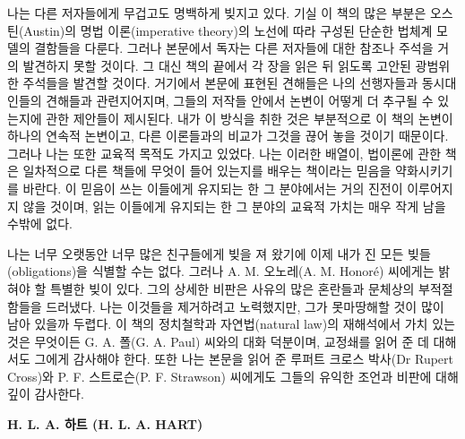 {나는 다른 저자들에게 무겁고도 명백하게 빚지고 있다. 기실 이 책의 많은
부분은 오스틴(Austin)의 명법 이론(imperative theory)의 노선에 따라
구성된 단순한 법체계 모델의 결함들을 다룬다. 그러나 본문에서 독자는 다른
저자들에 대한 참조나 주석을 거의 발견하지 못할 것이다. 그 대신 책의
끝에서 각 장을 읽은 뒤 읽도록 고안된 광범위한 주석들을 발견할 것이다.
거기에서 본문에 표현된 견해들은 나의 선행자들과 동시대인들의 견해들과
관련지어지며, 그들의 저작들 안에서 논변이 어떻게 더 추구될 수 있는지에
관한 제안들이 제시된다. 내가 이 방식을 취한 것은 부분적으로 이 책의
논변이 하나의 연속적 논변이고, 다른 이론들과의 비교가 그것을 끊어 놓을
것이기 때문이다. 그러나 나는 또한 교육적 목적도 가지고 있었다. 나는
이러한 배열이, 법이론에 관한 책은 일차적으로 다른 책들에 무엇이 들어
있는지를 배우는 책이라는 믿음을 약화시키기를 바란다. 이 믿음이 쓰는
이들에게 유지되는 한 그 분야에서는 거의 진전이 이루어지지 않을 것이며,
읽는 이들에게 유지되는 한 그 분야의 교육적 가치는 매우 작게 남을 수밖에
없다.

나는 너무 오랫동안 너무 많은 친구들에게 빚을 져 왔기에 이제 내가 진 모든
빚들(obligations)을 식별할 수는 없다. 그러나 A. M. 오노레(A. M. Honoré)
씨에게는 밝혀야 할 특별한 빚이 있다. 그의 상세한 비판은 사유의 많은
혼란들과 문체상의 부적절함들을 드러냈다. 나는 이것들을 제거하려고
노력했지만, 그가 못마땅해할 것이 많이 남아 있을까 두렵다. 이 책의
정치철학과 자연법(natural law)의 재해석에서 가치 있는 것은 무엇이든 G.
A. 폴(G. A. Paul) 씨와의 대화 덕분이며, 교정쇄를 읽어 준 데 대해서도
그에게 감사해야 한다. 또한 나는 본문을 읽어 준 루퍼트 크로스 박사(Dr
Rupert Cross)와 P. F. 스트로슨(P. F. Strawson) 씨에게도 그들의 유익한
조언과 비판에 대해 깊이 감사한다.

}

\vspace{1em}

\begin{flushright}
\textbf{H. L. A. 하트 (H. L. A. HART)}  %
\end{flushright}
